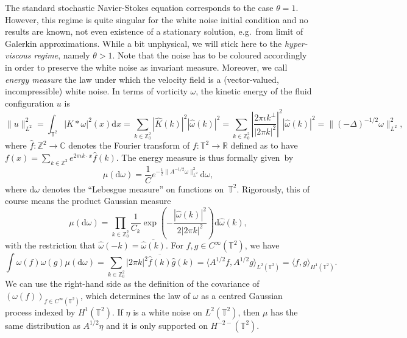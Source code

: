 \documentclass[10pt]{article}
\newcommand{\mathd}{\mathrm{d}}
\newcommand{\tmtextit}[1]{{\itshape{#1}}}
\begin{document}
The standard stochastic Navier-Stokes equation corresponds to the case
$\theta = 1$. However, this regime is quite singular for the white noise
initial condition and no results are known, not even existence of a stationary
solution, e.g.~from limit of Galerkin approximations. While a bit unphysical,
we will stick here to the \tmtextit{hyper-viscous regime}, namely $\theta >
1$. Note that the noise has to be coloured accordingly in order to preserve
the white noise as invariant measure. Moreover, we call \tmtextit{energy
measure} the law under which the velocity field is a (vector-valued,
incompressible) white noise. In terms of vorticity $\omega$, the kinetic
energy of the fluid configuration $u$ is
\[ \| u \|_{L^2}^2 = \int_{\mathbb{T}^2} | K \ast \omega |^2 (x) \mathd x =
   \sum_{k \in \mathbb{Z}_0^2} | \hat{K} (k) |^2 | \hat{\omega} (k) |^2 =
   \sum_{k \in \mathbb{Z}_0^2} \left| \frac{2 \pi \iota k^{\perp}}{| 2 \pi k
   |^2} \right|^2 | \hat{\omega} (k) |^2 = \| (- \Delta)^{- 1 / 2} \omega
   \|_{L^2}^2, \]
where $\hat{f} : \mathbb{Z}^2 \rightarrow \mathbb{C}$ denotes the Fourier
transform of $f : \mathbb{T}^2 \rightarrow \mathbb{R}$ defined as to have $f
(x) = \sum_{k \in \mathbb{Z}^2} e^{2 \pi \iota k \cdot x} \hat{f} (k)$. The
energy measure is thus formally given~by
\begin{equation}
  \mu (\mathd \omega) = \frac{1}{C} e^{- \frac{1}{2}  \| A^{- 1 / 2} \omega
  \|^2_{L^2}} \mathd \omega, \label{eq:energy-measure}
\end{equation}
where $\mathd \omega$ denotes the ``Lebesgue measure'' on functions
on~$\mathbb{T}^2$. Rigorously, this of course means the product Gaussian
measure
\[ \mu (\mathd \omega) = \prod_{k \in \mathbb{Z}_0^2} \frac{1}{C_k} \exp
   \left( - \frac{| \hat{\omega} (k) |^2}{2 | 2 \pi k |^2} \right) \mathd
   \hat{\omega} (k), \]
with the restriction that $\hat{\omega} (- k) = \overline{\hat{\omega} (k)}$.
For $f, g \in C^{\infty} (\mathbb{T}^2)$, we have
\[ \int \omega (f) \omega (g) \mu (\mathd \omega) = \sum_{k \in
   \mathbb{Z}_0^2} | 2 \pi k |^2  \overline{\hat{f} (k)}  \hat{g} (k) =
   \langle A^{1 / 2} f, A^{1 / 2} g \rangle_{L^2 (\mathbb{T}^2)} = \langle f,
   g \rangle_{H^1 (\mathbb{T}^2)} . \]
We can use the right-hand side as the definition of the covariance of $(\omega
(f))_{f \in C^{\infty} (\mathbb{T}^2)}$, which determines the law of $\omega$
as a centred Gaussian process indexed by $H^1 (\mathbb{T}^2)$. If $\eta$ is a
white noise on $L^2 (\mathbb{T}^2)$, then $\mu$ has the same distribution as
$A^{1 / 2} \eta$ and it is only supported on $H^{- 2 -} (\mathbb{T}^2)$.
\end{document}
